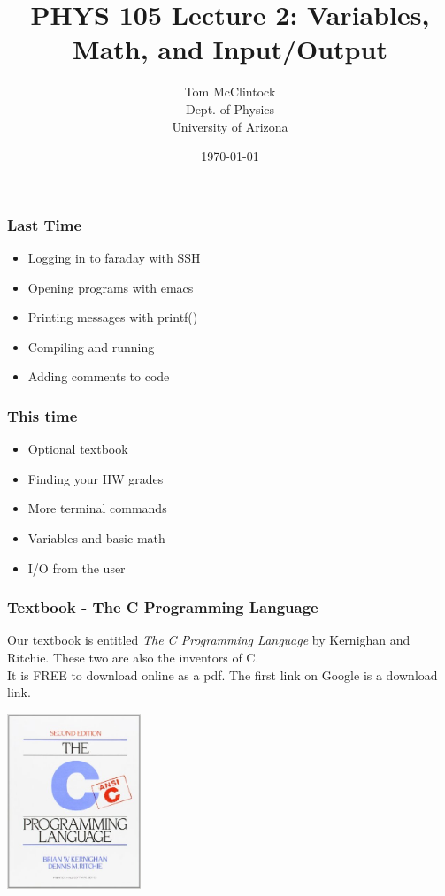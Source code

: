 \documentclass{beamer}
\title{PHYS 105 Lecture 2: Variables, Math, and Input/Output}
\author{Tom McClintock \\
	Dept. of Physics\\
	University of Arizona
}
\date{\today}
\begin{document}
\begin{frame}
  \titlepage
\end{frame}

\begin{frame}
  \frametitle{Last Time}
  \begin{itemize}
    \item Logging in to faraday with SSH
    \item Opening programs with emacs
    \item Printing messages with printf()
    \item Compiling and running
    \item Adding comments to code
  \end{itemize}
\end{frame}

\begin{frame}
  \frametitle{This time}
  \begin{itemize}
    \item Optional textbook
    \item Finding your HW grades
    \item More terminal commands
    \item Variables and basic math
    \item I/O from the user
  \end{itemize}
\end{frame}

\begin{frame}
  \frametitle{Textbook - The C Programming Language}
  Our textbook is entitled \textit{The C Programming Language} by
  Kernighan and Ritchie. These two are also the inventors of C.\\
  It is FREE to download online as a pdf. The first link on Google is 
  a download link.\\
  \begin{center}
    \includegraphics[width=0.3\textwidth]{CPL.jpg}
  \end{center}
\end{frame}
\end{document}
